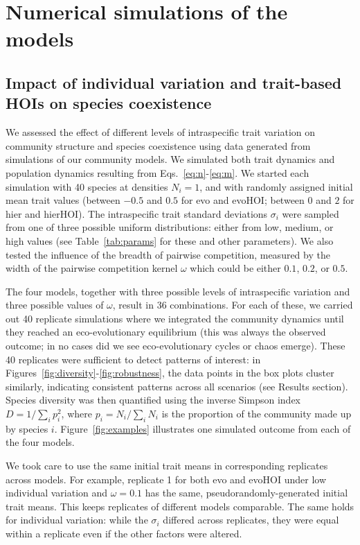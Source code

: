 \documentclass[11pt]{article}
\begin{document}
\section{Numerical simulations of the models}

\subsection{Impact of individual variation and trait-based HOIs on species coexistence}

We assessed the effect of different levels of intraspecific trait variation on community structure and species coexistence using data generated from simulations of our community models. We simulated both trait dynamics and population dynamics resulting from Eqs.~\ref{eq:n}-\ref{eq:m}. We started each simulation with 40 species at densities $N_i = 1$, and with randomly assigned initial mean trait values (between $-0.5$ and $0.5$ for evo and evoHOI; between $0$ and $2$ for hier and hierHOI). The intraspecific trait standard deviations $\sigma_i$ were sampled from one of three possible uniform distributions: either from low, medium, or high values (see Table~\ref{tab:params} for these and other parameters). We also tested the influence of the breadth of pairwise competition, measured by the width of the pairwise competition kernel $\omega$ which could be either $0.1$, $0.2$, or $0.5$.

The four models, together with three possible levels of intraspecific variation and three possible values of $\omega$, result in 36 combinations. For each of these, we carried out 40 replicate simulations where we integrated the community dynamics until they reached an eco-evolutionary equilibrium (this was always the observed outcome; in no cases did we see eco-evolutionary cycles or chaos emerge). These 40 replicates were sufficient to detect patterns of interest: in Figures~\ref{fig:diversity}-\ref{fig:robustness}, the data points in the box plots cluster similarly, indicating consistent patterns across all scenarios (see Results section). Species diversity was then quantified using the inverse Simpson index $D = 1/\sum_i p_i^2$, where $p_i = N_i / \sum_i N_i$ is the proportion of the community made up by species $i$. Figure~\ref{fig:examples} illustrates one simulated outcome from each of the four models.

We took care to use the same initial trait means in corresponding replicates across models. For example, replicate 1 for both evo and evoHOI under low individual variation and $\omega = 0.1$ has the same, pseudorandomly-generated initial trait means. This keeps replicates of different models comparable. The same holds for individual variation: while the $\sigma_i$ differed across replicates, they were equal within a replicate even if the other factors were altered.
\end{document}
